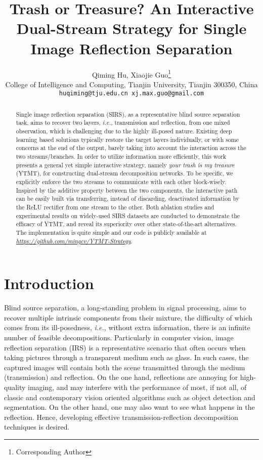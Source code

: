 \documentclass{article}
\title{Trash or Treasure? An Interactive Dual-Stream Strategy for Single Image Reflection Separation}
\author{Qiming Hu, Xiaojie Guo\thanks{Corresponding Author} \\
  College of Intelligence and Computing, Tianjin University, Tianjin 300350, China\\
  \texttt{huqiming@tju.edu.cn   xj.max.guo@gmail.com} \\
}
\begin{document}
\maketitle

\begin{abstract}
Single image reflection separation (SIRS), as a representative blind source separation task, aims to recover two layers, \emph{i.e.}, transmission and reflection, from one mixed observation, which is challenging due to the highly ill-posed nature. Existing deep learning based solutions typically restore the target layers individually, or with some concerns at the end of the output, barely taking into account the interaction across the two streams/branches. In order to utilize information more efficiently, this work presents a general yet simple interactive strategy, namely \emph{your trash is my treasure} (YTMT), for constructing dual-stream decomposition networks. To be specific, we explicitly enforce the two streams to communicate with each other block-wisely. Inspired by the additive property between the two components, the interactive path can be easily built via transferring, instead of discarding, deactivated information by the ReLU rectifier from one stream to the other. Both ablation studies and experimental results on widely-used SIRS datasets are conducted to demonstrate the efficacy of YTMT, and reveal its superiority over other state-of-the-art alternatives. The implementation is quite simple and our code is publicly available at \href{https://github.com/mingcv/YTMT-Strategy}{\emph{https://github.com/mingcv/YTMT-Strategy}}. 

\end{abstract}

\setcounter{footnote}{0} 

\section{Introduction}

Blind source separation, a long-standing problem in signal processing, aims to recover multiple intrinsic components from their mixture, the difficulty of which comes from its ill-posedness, \emph{i.e.}, without extra information, there is an infinite number of feasible decompositions. Particularly in computer vision, image reflection separation (IRS) is a representative scenario that often occurs when taking pictures through a transparent medium such as glass. In such cases, the captured images will contain both the scene transmitted through the medium (transmission) and reflection. On the one hand, reflections are annoying for high-quality imaging, and may interfere with the performance of most, if not all, of classic and contemporary vision oriented algorithms such as object detection and segmentation. On the other hand, one may also want to see what happens in the reflection. Hence, developing effective transmission-reflection decomposition techniques is desired. 
\end{document}
